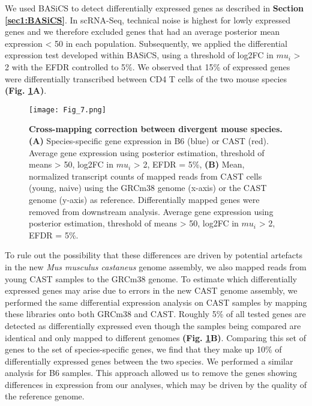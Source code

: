 We used BASiCS \citep{Vallejos2016} to detect differentially expressed genes as described in \textbf{Section \ref{sec1:BASiCS}}. In scRNA-Seq, technical noise is highest for lowly expressed genes \citep{Brennecke2013} and we therefore excluded genes that had an average posterior mean expression < 50 in each population. Subsequently, we applied the differential expression test developed within BASiCS, using a threshold of log2FC in $mu_i$ > 2 with the EFDR controlled to 5\%. We observed that 15\% of expressed genes were differentially transcribed between CD4\plus{} T cells of the two mouse species \textbf{(Fig. \ref{fig1:spec_spec_mapping}A)}. 

\begin{figure}[!hb]
\centering
\texttt{[image: Fig\_7.png]}
\caption[Cross-mapping correction between divergent mouse species]{\textbf{Cross-mapping correction between divergent mouse species.}\\
\textbf{(A)} Species-specific gene expression in B6 (blue) or CAST (red). Average gene expression using posterior estimation, threshold of means > 50, log2FC in $mu_i$ > 2, EFDR = 5\%, \textbf{(B)} Mean, normalized transcript counts of mapped reads from CAST cells (young, naive) using the GRCm38 genome (x-axis) or the CAST genome (y-axis) as reference. Differentially mapped genes were removed from downstream analysis. Average gene expression using posterior estimation, threshold of means > 50, log2FC in $mu_i$ > 2, EFDR = 5\%.
}
\label{fig1:spec_spec_mapping}
\end{figure}

To rule out the possibility that these differences are driven by potential artefacts in the new \textit{Mus musculus castaneus} genome assembly, we also mapped reads from young CAST samples to the GRCm38 genome. To estimate which differentially expressed genes may arise due to errors in the new CAST genome assembly, we performed the same differential expression analysis on CAST samples by mapping these libraries onto both GRCm38 and CAST. Roughly 5\% of all tested genes are detected as differentially expressed even though the samples being compared are identical and only mapped to different genomes \textbf{(Fig. \ref{fig1:spec_spec_mapping}B)}. Comparing this set of genes to the set of species-specific genes, we find that they make up 10\% of differentially expressed genes between the two species. We performed a similar analysis for B6 samples. This approach allowed us to remove the genes showing differences in expression from our analyses, which may be driven by the quality of the reference genome.

